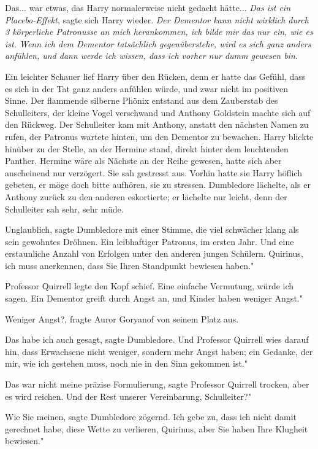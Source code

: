 Das... war etwas, das Harry normalerweise nicht gedacht hätte... \emph{Das ist
ein Placebo-Effekt}, sagte sich Harry wieder. \emph{Der Dementor kann nicht
wirklich durch 3 körperliche Patronusse an mich herankommen, ich bilde mir das
nur ein, wie es ist. Wenn ich dem Dementor tatsächlich gegenüberstehe, wird es
sich ganz anders anfühlen, und dann werde ich wissen, dass ich vorher nur dumm
gewesen bin}.

Ein leichter Schauer lief Harry über den Rücken, denn er hatte das Gefühl, dass
es sich in der Tat ganz anders anfühlen würde, und zwar nicht im positiven
Sinne. Der flammende silberne Phönix entstand aus dem Zauberstab des
Schulleiters, der kleine Vogel verschwand und Anthony Goldstein machte sich auf
den Rückweg. Der Schulleiter kam mit Anthony, anstatt den nächsten Namen zu
rufen, der Patronus wartete hinten, um den Dementor zu bewachen. Harry blickte
hinüber zu der Stelle, an der Hermine stand, direkt hinter dem leuchtenden
Panther. Hermine wäre als Nächste an der Reihe gewesen, hatte sich aber
anscheinend nur verzögert. Sie sah gestresst aus. Vorhin hatte sie Harry höflich
gebeten, er möge doch bitte aufhören, sie zu stressen. Dumbledore lächelte, als
er Anthony zurück zu den anderen eskortierte; er lächelte nur leicht, denn der
Schulleiter sah sehr, sehr müde.

\glqq Unglaublich\grqq{}, sagte Dumbledore mit einer Stimme, die viel schwächer
klang als sein gewohntes Dröhnen. \glqq Ein leibhaftiger Patronus, im ersten
Jahr. Und eine erstaunliche Anzahl von Erfolgen unter den anderen jungen
Schülern. Quirinus, ich muss anerkennen, dass Sie Ihren Standpunkt bewiesen
haben."

Professor Quirrell legte den Kopf schief. \glqq Eine einfache Vermutung, würde
ich sagen. Ein Dementor greift durch Angst an, und Kinder haben weniger Angst."

\glqq Weniger Angst?\grqq{}, fragte Auror Goryanof von seinem Platz aus.

\glqq Das habe ich auch gesagt\grqq{}, sagte Dumbledore. \glqq Und Professor
Quirrell wies darauf hin, dass Erwachsene nicht weniger, sondern mehr Angst
haben; ein Gedanke, der mir, wie ich gestehen muss, noch nie in den Sinn
gekommen ist."

\glqq Das war nicht meine präzise Formulierung\grqq{}, sagte Professor Quirrell
trocken, \glqq aber es wird reichen. Und der Rest unserer Vereinbarung,
Schulleiter?"

\glqq Wie Sie meinen\grqq{}, sagte Dumbledore zögernd. \glqq Ich gebe zu, dass
ich nicht damit gerechnet habe, diese Wette zu verlieren, Quirinus, aber Sie
haben Ihre Klugheit bewiesen."

